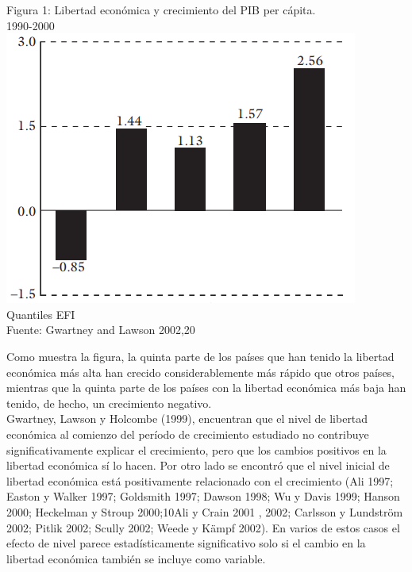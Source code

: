     \begin{center}
	Figura 1: Libertad económica y crecimiento del PIB per cápita.\\
	1990-2000\\
	\includegraphics[scale=.5]{codigoFuente/tareas/pensamiento/img/1pensamiento.png}\\
	Quantiles EFI\\
	\small{Fuente: Gwartney and Lawson 2002,20}
    \end{center}

    Como muestra la figura, la quinta parte de los países que han tenido la libertad económica más alta han crecido considerablemente más rápido que otros países, mientras que la quinta parte de los países con la libertad económica más baja han tenido, de hecho, un crecimiento negativo. \\
    Gwartney, Lawson y Holcombe (1999), encuentran que el nivel de libertad económica al comienzo del período de crecimiento estudiado no contribuye significativamente explicar el crecimiento, pero que los cambios positivos en la libertad económica sí lo hacen. Por otro lado se encontró que el nivel inicial de libertad económica está positivamente relacionado con el crecimiento (Ali 1997; Easton y Walker 1997; Goldsmith 1997; Dawson 1998; Wu y Davis 1999; Hanson 2000; Heckelman y Stroup 2000;10Ali y Crain 2001 , 2002; Carlsson y Lundström 2002; Pitlik 2002; Scully 2002; Weede y Kämpf 2002). En varios de estos casos el efecto de nivel parece estadísticamente significativo solo si el cambio en la libertad económica también se incluye como variable.\\


